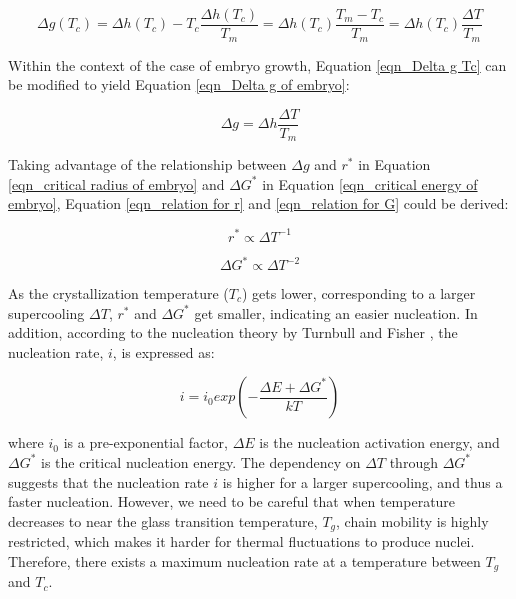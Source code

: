 \begin{equation}
\label{eqn_Delta g Tc}
\Delta g(T_{c}) = \Delta h(T_{c}) - T_{c} \dfrac{\Delta h(T_{c})}{T_{m}} = \Delta h(T_{c}) \dfrac{T_{m} - T_{c}}{T_{m}} = \Delta h(T_{c}) \dfrac{\Delta T}{T_{m}}
\end{equation}

Within the context of the case of embryo growth, Equation \ref{eqn_Delta g Tc} can be modified to yield Equation \ref{eqn_Delta g of embryo}:

\begin{equation}
\label{eqn_Delta g of embryo}
\Delta g = \Delta h \dfrac{\Delta T}{T_{m}}
\end{equation}

Taking advantage of the relationship between $\Delta g$ and $r^{*}$ in Equation \ref{eqn_critical radius of embryo} and $\Delta G^{*}$ in Equation \ref{eqn_critical energy of embryo}, Equation \ref{eqn_relation for r} and \ref{eqn_relation for G} could be derived:

\begin{equation}
\label{eqn_relation for r}
r^{*} \propto \Delta T^{-1}
\end{equation}

\begin{equation}
\label{eqn_relation for G}
\Delta G^{*} \propto \Delta T^{-2}
\end{equation}

As the crystallization temperature ($T_{c}$) gets lower, corresponding to a larger supercooling $\Delta T$, $r^{*}$ and $\Delta G^{*}$ get smaller, indicating an easier nucleation. In addition, according to the nucleation theory by Turnbull and Fisher \cite{Turnbull1949}, the nucleation rate, $i$, is expressed as:

\begin{equation}
\label{eqn_nucleation rate}
i = i_{0}exp(- \dfrac{\Delta E + \Delta G^{*}}{k T})
\end{equation}

\noindent
where $i_{0}$ is a pre-exponential factor, $\Delta E$ is the nucleation activation energy, and $\Delta G^{*}$ is the critical nucleation energy. The dependency on $\Delta T$ through $\Delta G^{*}$ suggests that the nucleation rate $i$ is higher for a larger supercooling, and thus a faster nucleation. However, we need to be careful that when temperature decreases to near the glass transition temperature, $T_{g}$, chain mobility is highly restricted, which makes it harder for thermal fluctuations to produce nuclei. Therefore, there exists a maximum nucleation rate at a temperature between $T_{g}$ and $T_{c}$.

